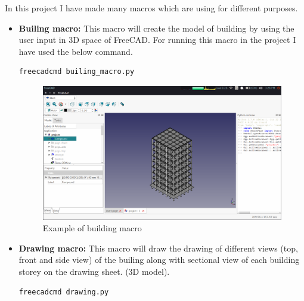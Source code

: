 In this project I have made many macros which are using for different purposes.
\begin{itemize}
\item \textbf{Builing macro:} This macro will create the model of building by
using the user input in 3D space of FreeCAD. For running this macro in the 
project I have used the below command.
\begin{verbatim}
freecadcmd builing_macro.py
\end{verbatim}
\begin{figure}[h!]                                                      
\begin{center}                                                          
\includegraphics[scale=0.35]{images/building_macro.png}
\caption{Example of building macro}                                   
\end{center}                                                            
\end{figure}
\item \textbf{Drawing macro:} This macro will draw the drawing of different 
views (top, front and side view) of the builing along with sectional view of each 
building storey on the drawing sheet.
(3D model).
\begin{verbatim}                                                      
freecadcmd drawing.py                                                
\end{verbatim}
\begin{figure}[h!]                                                      
\begin{center}                                                          

\end{center}
\end{figure}
\end{itemize}
